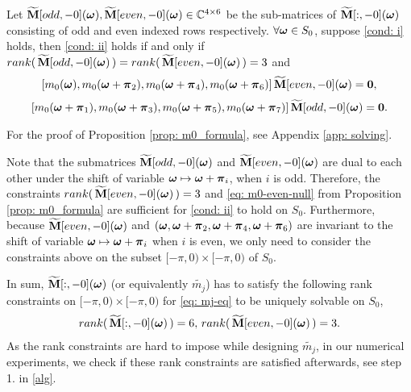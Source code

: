 \begin{proposition}\label{prop: m0_formula}
Let $\widetilde{\mathbf{M}}[odd,-0](\boldsymbol{\omega}),\widetilde{\mathbf{M}}[even,-0](\boldsymbol{\omega})\in\mathbb{C}^{4\times6}$ be the sub-matrices of $\widetilde{\mathbf{M}}[:,-0](\boldsymbol{\omega})$ consisting of odd and even indexed rows respectively. $\forall\boldsymbol{\omega}\in S_0$, suppose {\rm\ref{cond: i}} holds, then {\rm\ref{cond: ii}} holds if and only if $rank(\,\widetilde{\mathbf{M}}[odd,-0](\boldsymbol{\omega})\,) = rank(\,\widetilde{\mathbf{M}}[even,-0](\boldsymbol{\omega})\,) = 3$ and 
\begin{align}\label{eq: m0-even-null}
[m_0(\boldsymbol{\omega}),m_0(\boldsymbol{\omega}+\boldsymbol{\pi}_2), m_0(\boldsymbol{\omega} +\boldsymbol{\pi}_4), m_0(\boldsymbol{\omega}+\boldsymbol{\pi}_6)]\, \widetilde{\mathbf{M}}[even,-0](\boldsymbol{\omega}) = \boldsymbol{0},
\end{align}
\begin{align}\label{eq: m0-odd-null}
[m_0(\boldsymbol{\omega}+\boldsymbol{\pi}_1),m_0(\boldsymbol{\omega}+\boldsymbol{\pi}_3), m_0(\boldsymbol{\omega} +\boldsymbol{\pi}_5), m_0(\boldsymbol{\omega}+\boldsymbol{\pi}_7)] \,\widetilde{\mathbf{M}}[odd,-0](\boldsymbol{\omega}) = \boldsymbol{0}.
\end{align}
\end{proposition}

For the proof of Proposition \ref{prop: m0_formula}, see Appendix \ref{app: solving}.

Note that the submatrices $\widetilde{\mathbf{M}}[odd,-0](\boldsymbol{\omega})$ and $\widetilde{\mathbf{M}}[even,-0](\boldsymbol{\omega})$ are dual to each other under the shift of variable $\boldsymbol{\omega}\mapsto \boldsymbol{\omega}+\boldsymbol{\pi}_i$, when $i$ is odd. Therefore, the constraints $rank(\,\widetilde{\mathbf{M}}[even,-0](\boldsymbol{\omega})\,) = 3$ and \eqref{eq: m0-even-null} from Proposition \ref{prop: m0_formula} are sufficient for \ref{cond: ii} to hold on $S_0$. Furthermore, because $\widetilde{\mathbf{M}}[even, -0](\boldsymbol{\omega})$ and $(\boldsymbol{\omega},\boldsymbol{\omega}+\boldsymbol{\pi}_2,\boldsymbol{\omega}+\boldsymbol{\pi}_4, \boldsymbol{\omega} + \boldsymbol{\pi}_6)$ are invariant to the shift of variable $\boldsymbol{\omega}\mapsto\boldsymbol{\omega}+\boldsymbol{\pi}_i$ when $i$ is even, we only need to consider the constraints above on the subset $[-\pi,0)\times[-\pi,0)$ of $S_0$.

In sum, $\widetilde{\mathbf{M}}[:,-0](\boldsymbol{\omega})$ (or equivalently $\widetilde{m_j}$) has to satisfy the following rank constraints on $[-\pi,0)\times[-\pi,0)$ for \eqref{eq: mj-eq} to be uniquely solvable on $S_0$, 
\begin{align}\label{eq: Mranks}
rank(\,\widetilde{\mathbf{M}}[:,-0](\boldsymbol{\omega})\,) = 6,\, rank(\,\widetilde{\mathbf{M}}[even,-0](\boldsymbol{\omega})\,) = 3.
\end{align}
As the rank constraints are hard to impose while designing $\widetilde{m_j}$, in our numerical experiments, we check if these rank constraints are satisfied afterwards, see step 1. in \ref{alg}.

